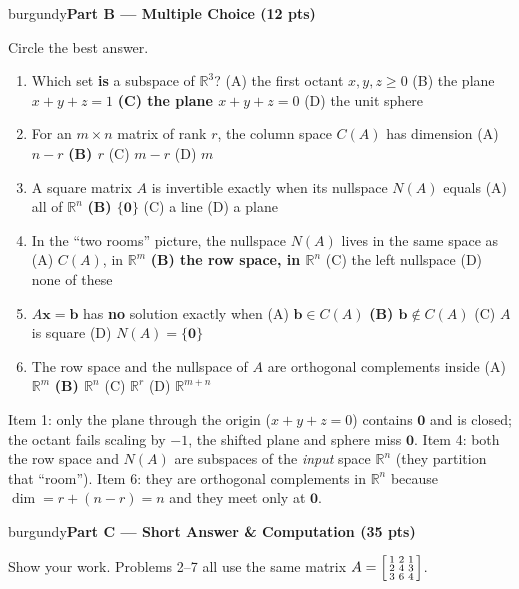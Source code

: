 \documentclass[10pt]{article}
\newcommand{\bb}{\mathbf{b}}
\newcommand{\xx}{\mathbf{x}}
\newcommand{\zero}{\mathbf{0}}
\newcommand{\parthead}[1]{%
  \vspace{6pt}\noindent
  \begin{headlinebox}{burgundy}{\color{white}\bfseries #1}\end{headlinebox}%
  \vspace{4pt}}
\begin{document}
\parthead{Part B --- Multiple Choice (12 pts)}
Circle the best answer.

\begin{enumerate}[leftmargin=1.9em, itemsep=9pt]
  \item Which set \textbf{is} a subspace of $\mathbb{R}^3$?
    \hfill (A) the first octant $x,y,z\ge 0$ \quad (B) the plane $x+y+z=1$ \quad \textbf{(C) the plane $x+y+z=0$} \ans{$\leftarrow$} \quad (D) the unit sphere
  \item For an $m\times n$ matrix of rank $r$, the column space $C(A)$ has dimension
    \hfill (A) $n-r$ \quad \textbf{(B) $r$} \ans{$\leftarrow$} \quad (C) $m-r$ \quad (D) $m$
  \item A square matrix $A$ is invertible exactly when its nullspace $N(A)$ equals
    \hfill (A) all of $\mathbb{R}^n$ \quad \textbf{(B) $\{\zero\}$} \ans{$\leftarrow$} \quad (C) a line \quad (D) a plane
  \item In the ``two rooms'' picture, the nullspace $N(A)$ lives in the same space as
    \hfill (A) $C(A)$, in $\mathbb{R}^m$ \quad \textbf{(B) the row space, in $\mathbb{R}^n$} \ans{$\leftarrow$} \quad (C) the left nullspace \quad (D) none of these
  \item $A\xx=\bb$ has \textbf{no} solution exactly when
    \hfill (A) $\bb\in C(A)$ \quad \textbf{(B) $\bb\notin C(A)$} \ans{$\leftarrow$} \quad (C) $A$ is square \quad (D) $N(A)=\{\zero\}$
  \item The row space and the nullspace of $A$ are orthogonal complements inside
    \hfill (A) $\mathbb{R}^m$ \quad \textbf{(B) $\mathbb{R}^n$} \ans{$\leftarrow$} \quad (C) $\mathbb{R}^r$ \quad (D) $\mathbb{R}^{m+n}$
\end{enumerate}

\begin{teachernote}
Item 1: only the plane through the origin ($x+y+z=0$) contains $\zero$ and is closed; the octant fails
scaling by $-1$, the shifted plane and sphere miss $\zero$. Item 4: both the row space and $N(A)$ are
subspaces of the \emph{input} space $\mathbb{R}^n$ (they partition that ``room''). Item 6: they are
orthogonal complements in $\mathbb{R}^n$ because $\dim=r+(n-r)=n$ and they meet only at $\zero$.
\end{teachernote}

\parthead{Part C --- Short Answer \& Computation (35 pts)}
Show your work. Problems 2--7 all use the same matrix
$A=\begin{bsmallmatrix}1&2&1\\2&4&3\\3&6&4\end{bsmallmatrix}$.
\end{document}
